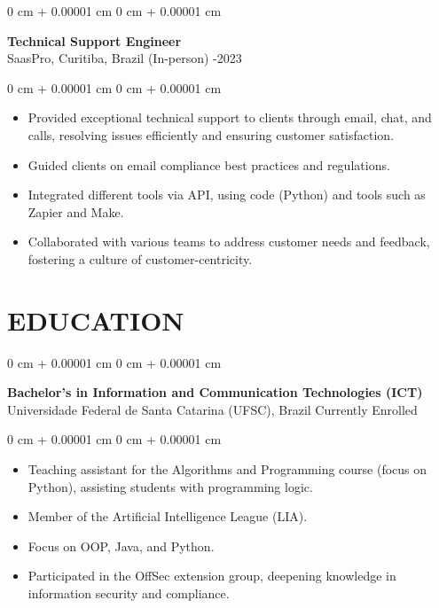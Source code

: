 \documentclass[10pt, letterpaper]{article}
\newenvironment{highlights}{
    \begin{itemize}[
        topsep=0.10 cm,
        parsep=0.10 cm,
        partopsep=0pt,
        itemsep=0pt,
        leftmargin=0 cm + 10pt
    ]
}{
    \end{itemize}
}
\newenvironment{onecolentry}{
    \begin{adjustwidth}{
        0 cm + 0.00001 cm
    }{
        0 cm + 0.00001 cm
    }
}{
    \end{adjustwidth}
}
\begin{document}
\vspace{0.2cm}

\begin{onecolentry}
    \setcolumnwidth{\fill, 4.5cm}
    \begin{paracol}{2}
        \textbf{Technical Support Engineer} \\ SaasPro, Curitiba, Brazil (In-person)
        \switchcolumn
        -2023
    \end{paracol}
\end{onecolentry}
\vspace{0.10cm}
\begin{onecolentry}
    \begin{highlights}
                \item Provided exceptional technical support to clients through email, chat, and calls, resolving issues efficiently and ensuring customer satisfaction.
                \item Guided clients on email compliance best practices and regulations.
                \item Integrated different tools via API, using code (Python) and tools such as Zapier and Make.
                \item Collaborated with various teams to address customer needs and feedback, fostering a culture of customer-centricity.
    \end{highlights}
\end{onecolentry}

\section{EDUCATION}

\begin{onecolentry}
    \setcolumnwidth{\fill, 4.5cm}
    \begin{paracol}{2}
        \textbf{Bachelor’s in Information and Communication Technologies (ICT)} \\ Universidade Federal de Santa Catarina (UFSC), Brazil
        \switchcolumn
        \raggedleft Currently Enrolled
    \end{paracol}
\end{onecolentry}
\vspace{0.10cm}
\begin{onecolentry}
    \begin{highlights}
                \item Teaching assistant for the Algorithms and Programming course (focus on Python), assisting students with programming logic.
                \item Member of the Artificial Intelligence League (LIA).
                \item Focus on OOP, Java, and Python.
                \item Participated in the OffSec extension group, deepening knowledge in information security and compliance.
    \end{highlights}
\end{onecolentry}
\end{document}
